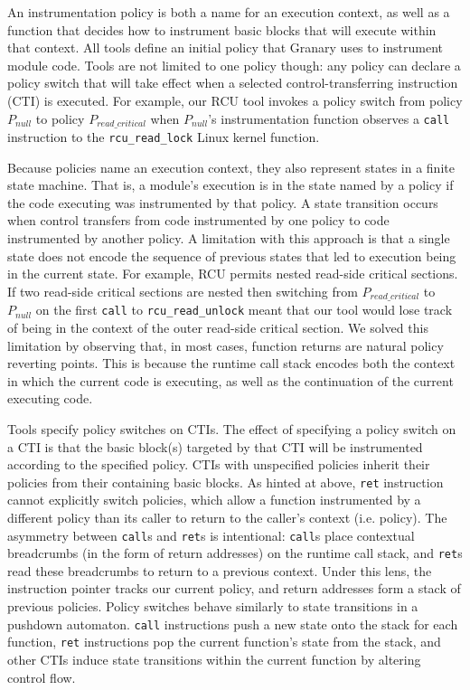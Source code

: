 \documentclass[preprint]{sigplanconf}
\begin{document}
An instrumentation policy is both a name for an execution context, as well as a function that decides how to instrument basic blocks that will execute within that context. All tools define an initial policy that Granary uses to instrument module code. Tools are not limited to one policy though: any policy can declare a policy switch that will take effect when a selected control-transferring instruction (CTI) is executed. For example, our RCU tool invokes a policy switch from policy $P_{null}$ to policy $P_{read\_critical}$ when $P_{null}$'s instrumentation function observes a \texttt{call} instruction to the \texttt{rcu\_read\_lock} Linux kernel function.

Because policies name an execution context, they also represent states in a finite state machine. That is, a module's execution is in the state named by a policy if the code executing was instrumented by that policy. A state transition occurs when control transfers from code instrumented by one policy to code instrumented by another policy. A limitation with this approach is that a single state does not encode the sequence of previous states that led to execution being in the current state. For example, RCU permits nested read-side critical sections. If two read-side critical sections are nested then switching from $P_{read\_critical}$ to $P_{null}$ on the first \texttt{call} to \texttt{rcu\_read\_unlock} meant that our tool would lose track of being in the context of the outer read-side critical section. We solved this limitation by observing that, in most cases, function returns are natural policy reverting points. This is because the runtime call stack encodes both the context in which the current code is executing, as well as the continuation of the current executing code.

Tools specify policy switches on CTIs. The effect of specifying a policy switch on a CTI is that the basic block(s) targeted by that CTI will be instrumented according to the specified policy. CTIs with unspecified policies inherit their policies from their containing basic blocks. As hinted at above, \texttt{ret} instruction cannot explicitly switch policies, which allow a function instrumented by a different policy than its caller to return to the caller's context (i.e. policy). The asymmetry between \texttt{call}s and \texttt{ret}s is intentional: \texttt{call}s place contextual breadcrumbs (in the form of return addresses) on the runtime call stack, and \texttt{ret}s read these breadcrumbs to return to a previous context. Under this lens, the instruction pointer tracks our current policy, and return addresses form a stack of previous policies. Policy switches behave similarly to state transitions in a pushdown automaton. \texttt{call} instructions push a new state onto the stack for each function, \texttt{ret} instructions pop the current function's state from the stack, and other CTIs induce state transitions within the current function by altering control flow.
\end{document}

